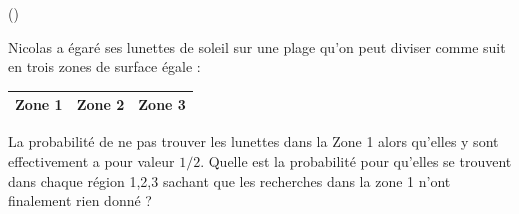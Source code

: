 \begin{exercice}\label{exo3-10} (\coolexo)

Nicolas a \'egar\'e ses lunettes de soleil sur une plage qu'on peut diviser comme 
suit en trois zones de surface \'egale :\\

\begin{table}[h]
\center
\begin{tabular}{|c|c|c|}
\hline
Zone 1 & Zone 2 & Zone 3\\ 
\hline
\end{tabular}
\end{table}

La probabilit\'e de ne pas trouver les lunettes dans la Zone 1 alors qu'elles y sont effectivement
a pour valeur $1/2$. Quelle est la probabilit\'e pour qu'elles se trouvent dans chaque
r\'egion 1,2,3 sachant que les recherches dans la zone 1 n'ont finalement rien donn\'e ?\\


\end{exercice}

